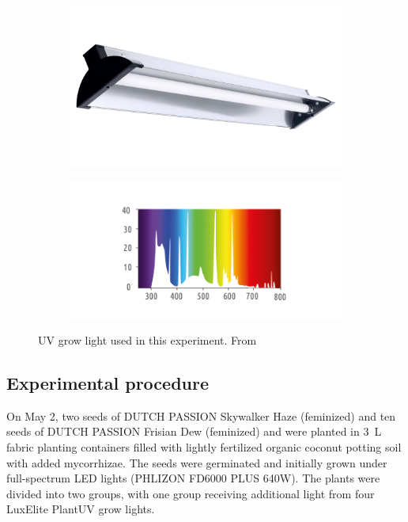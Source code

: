 \begin{figure}[htbp]
    \begin{subfigure}[t]{.48\textwidth}
        \includegraphics[width=\linewidth]{LuxElite_PlantUV}
        \label{fig:uv_grow_light_img}
    \end{subfigure}
    \begin{subfigure}[t]{.48\textwidth}
        \includegraphics[width=\linewidth]{LuxElite_PlantUV_light-spectrum}
        \label{fig:uv_grow_light_spectrum}
    \end{subfigure}
    \caption[UV grow light used in this experiment]{UV grow light used in this experiment. From }
    \label{fig:uv_grow_light}
\end{figure}

\subsection{Experimental procedure}

On May 2, two seeds of DUTCH PASSION Skywalker Haze (feminized) and ten seeds of DUTCH PASSION Frisian Dew (feminized) and  were planted in \qty[mode=text]{3}{\L} fabric planting containers filled with lightly fertilized organic coconut potting soil with added mycorrhizae. The seeds were germinated and initially grown under full-spectrum LED lights (PHLIZON FD6000 PLUS 640W). The plants were divided into two groups, with one group receiving additional light from four LuxElite PlantUV grow lights.

